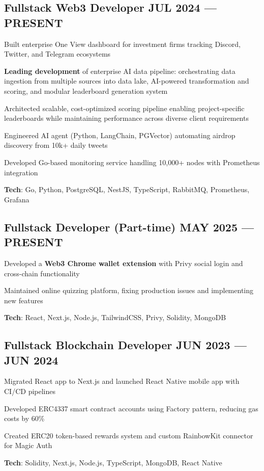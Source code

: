 \documentclass[letter,10pt]{article}
\begin{document}
\subsection{{Fullstack Web3 Developer \hfill JUL 2024 --- PRESENT}}
\begin{zitemize}
  \item Built enterprise One View dashboard for investment firms tracking Discord, Twitter, and Telegram ecosystems
  \item \textbf{Leading development} of enterprise AI data pipeline: orchestrating data ingestion from multiple sources into data lake, AI-powered transformation and scoring, and modular leaderboard generation system
  \item Architected scalable, cost-optimized scoring pipeline enabling project-specific leaderboards while maintaining performance across diverse client requirements
  \item Engineered AI agent (Python, LangChain, PGVector) automating airdrop discovery from 10k+ daily tweets
  \item Developed Go-based monitoring service handling 10,000+ nodes with Prometheus integration
  \item \textbf{Tech}: Go, Python, PostgreSQL, NestJS, TypeScript, RabbitMQ, Prometheus, Grafana
\end{zitemize}


\subsection{{Fullstack Developer (Part-time) \hfill MAY 2025 --- PRESENT}}
\begin{zitemize}
  \item Developed a \textbf{Web3 Chrome wallet extension} with Privy social login and cross-chain functionality
  \item Maintained online quizzing platform, fixing production issues and implementing new features
  \item \textbf{Tech}: React, Next.js, Node.js, TailwindCSS, Privy, Solidity, MongoDB
\end{zitemize}



\subsection{{ Fullstack Blockchain Developer \hfill JUN 2023 --- JUN 2024}}
\begin{zitemize}
  \item Migrated React app to Next.js and launched React Native mobile app with CI/CD pipelines
  \item Developed ERC4337 smart contract accounts using Factory pattern, reducing gas costs by 60\%
  \item Created ERC20 token-based rewards system and custom RainbowKit connector for Magic Auth
  \item \textbf{Tech}: Solidity, Next.js, Node.js, TypeScript, MongoDB, React Native
\end{zitemize}
\end{document}

